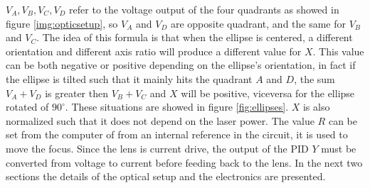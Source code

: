 \documentclass[a4paper,10pt]{article}
\begin{document}
$V_A,V_B,V_C,V_D$ refer to the voltage output of the four quadrants as showed in figure \ref{img:opticsetup}, so $V_A$ and $V_D$ are opposite quadrant, and the same for $V_B$ and $V_C$. The idea of this formula is that when the ellipse is centered, a different orientation and different axis ratio will produce a different value for $X$. This value can be both negative or positive depending on the ellipse's orientation, in fact if the ellipse is tilted such that it mainly hits the quadrant $A$ and $D$, the sum $V_A+ V_D$ is greater then $V_B+V_C$ and $X$ will be positive, viceversa for the ellipse rotated of $90^\circ$. These situations are showed in figure \ref{fig:ellipses}. $X$ is also normalized such that it does not depend on the laser power. The value $R$ can be set from the computer of from an internal reference in the circuit, it is used to move the focus. Since the lens is current drive, the output of the PID $Y$ must be converted from voltage to current before feeding back to the lens. In the next two sections the details of the optical setup and the electronics are presented.
\end{document}
